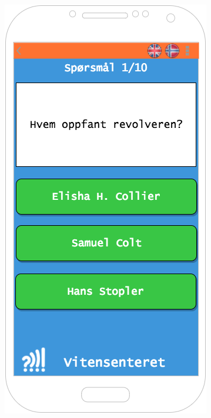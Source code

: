 \begin{figure}[H]
  
  \begin{minipage}[b]{0.35\textwidth}
    \includegraphics[width=\textwidth]{images/sketches/quiz.png}

\end{minipage}
\end{figure}
